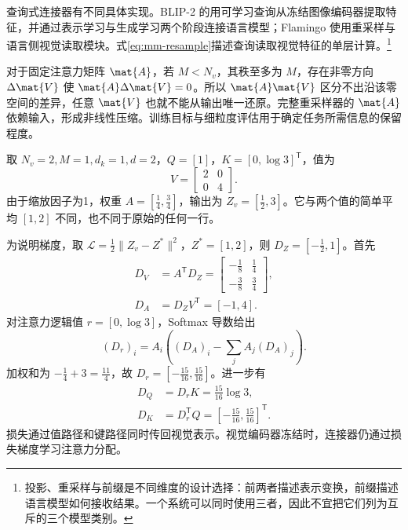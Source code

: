 \documentclass[../textbook.tex]{subfiles}
\begin{document}
查询式连接器有不同具体实现。BLIP-2 的用可学习查询从冻结图像编码器提取特征，并通过表示学习与生成学习两个阶段连接语言模型\cite{li2023blip2}；Flamingo 使用重采样与语言侧视觉读取模块\cite{alayrac2022flamingo}。式\ref{eq:mm-resample}描述查询读取视觉特征的单层计算。\footnote{投影、重采样与前缀是不同维度的设计选择：前两者描述表示变换，前缀描述语言模型如何接收结果。一个系统可以同时使用三者，因此不宜把它们列为互斥的三个模型类别。}

对于固定注意力矩阵 $\mat{A}$，若 $M<N_v$，其秩至多为 $M$，存在非零方向 $\Delta \mat{V}$ 使 $\mat{A}\Delta \mat{V}=0$。所以 $\mat{A}\mat{V}$ 区分不出沿该零空间的差异，任意 $\mat{V}$ 也就不能从输出唯一还原。完整重采样器的 $\mat{A}$ 依赖输入，形成非线性压缩。训练目标与细粒度评估用于确定任务所需信息的保留程度。

\begin{example}[查询重采样的梯度]

取 $N_v=2,M=1,d_k=1,d=2$，$Q=[1]$，$K=[0,\log3]^{\mathsf T}$，值为
\begin{equation*}
 V=\begin{bmatrix}2&0\\0&4\end{bmatrix}.
\end{equation*}
由于缩放因子为1，权重 $A=[\frac{1}{4},\frac{3}{4}]$，输出为 $Z_v=[\frac{1}{2},3]$。它与两个值的简单平均 $[1,2]$ 不同，也不同于原始的任何一行。

为说明梯度，取 $\mathcal L=\frac{1}{2}\|Z_v-Z^*\|^2$，$Z^*=[1,2]$，则 $D_Z=[-\frac{1}{2},1]$。首先
\begin{align*}
 D_V &= A^{\mathsf T}D_Z
 =\begin{bmatrix}-\frac{1}{8}&\frac{1}{4}\\-\frac{3}{8}&\frac{3}{4}\end{bmatrix}, \\
 D_A &= D_ZV^{\mathsf T}=[-1,4].
\end{align*}
对注意力逻辑值 $r=[0,\log3]$，Softmax 导数给出
\begin{equation*}
 (D_r)_i=A_i\left((D_A)_i-\sum_jA_j(D_A)_j\right).
\end{equation*}
加权和为 $-\frac{1}{4}+3=\frac{11}{4}$，故 $D_r=[-\frac{15}{16},\frac{15}{16}]$。进一步有
\begin{align*}
 D_Q &= D_rK=\frac{15}{16}\log3, \\
 D_K &= D_r^{\mathsf T}Q=[-\frac{15}{16},\frac{15}{16}]^{\mathsf T}.
\end{align*}
损失通过值路径和键路径同时传回视觉表示。视觉编码器冻结时，连接器仍通过损失梯度学习注意力分配。
\end{example}
\end{document}
